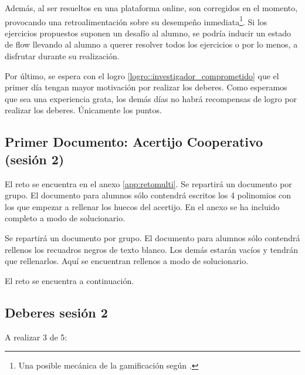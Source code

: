 	Además, al ser resueltos en una plataforma online, son corregidos en el momento, provocando una retroalimentación sobre su desempeño inmediata\footnote{Una posible mecánica de la gamificación según \citeauthor{werbach2012win}.}.
	Si los ejercicios propuestos suponen un desafío al alumno, se podría inducir un estado de flow llevando al alumno a querer resolver todos los ejercicios o por lo menos, a disfrutar durante su realización.

	Por último, se espera con el logro \ref{logro::investigador_comprometido} que el primer día tengan mayor motivación por realizar los deberes.
	Como esperamos que sea una experiencia grata, los demás días no habrá recompensas de logro por realizar los deberes. 
	Únicamente los puntos.


\subsection{Primer Documento: Acertijo Cooperativo (sesión 2)}
\label{app:ses2:coop}



\ifinapp
	El reto se encuentra en el anexo \ref{app:retomulti}.
	Se repartirá un documento por grupo. 
	El documento para alumnos sólo contendrá escritos los 4 polinomios con los que empezar a rellenar los huecos del acertijo.
	En el anexo se ha incluido completo a modo de solucionario.

\else 
	Se repartirá un documento por grupo. 
	El documento para alumnos sólo contendrá rellenos los recuadros negros de texto blanco.
	Los demás estarán vacíos y tendrán que rellenarlos.
	Aquí se encuentran rellenos a modo de solucionario.

	El reto se encuentra a continuación.
	
\fi




\subsection{Deberes sesión 2}
\label{app:ses2:deberes}

\newbloq A realizar 3 de 5:




